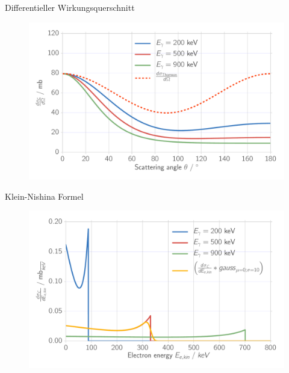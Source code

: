 \documentclass[xcolor=x11names,compress]{beamer}
\renewcommand{\(}{\begin{columns}}
\renewcommand{\)}{\end{columns}}
\newcommand{\<}[1]{\begin{column}{#1}}
\renewcommand{\>}{\end{column}}
\begin{document}
\begin{frame}[t]{Differentieller Wirkungsquerschnitt}
\begin{figure}[htpb]
    \centering
    \includegraphics[width=1.0\linewidth]{../analysis/figures/theory_diff_cs}
\label{fig:theory_diff}
\end{figure}
\end{frame}

\begin{frame}[t]{Klein-Nishina Formel}
\begin{figure}[htpb]
    \centering
    \includegraphics[width=1.0\linewidth]{../analysis/figures/theory_dsde}
\label{fig:theory_kn}
\end{figure}
\end{frame}
\end{document}
